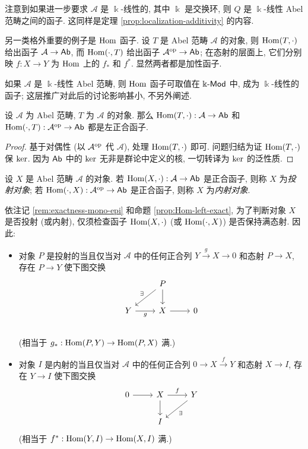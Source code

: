 注意到如果进一步要求 $\mathcal{A}$ 是 $\Bbbk$-线性的, 其中 $\Bbbk$ 是交换环, 则 $Q$ 是 $\Bbbk$-线性 Abel 范畴之间的函子. 这同样是定理 \ref{prop:localization-additivity} 的内容.

另一类格外重要的例子是 $\operatorname{Hom}$ 函子. 设 $T$ 是 Abel 范畴 $\mathcal{A}$ 的对象, 则 $\operatorname{Hom}(T, \cdot)$ 给出函子 $\mathcal{A} \to \mathsf{Ab}$, 而 $\operatorname{Hom}(\cdot, T)$ 给出函子 $\mathcal{A}^{\operatorname{op}} \to \mathsf{Ab}$; 在态射的层面上, 它们分别映 $f: X \to Y$ 为 $\operatorname{Hom}$ 上的 $f_*$ 和 $f^*$. 显然两者都是加性函子.

如果 $\mathcal{A}$ 是 $\Bbbk$-线性 Abel 范畴, 则 $\operatorname{Hom}$ 函子可取值在 $\Bbbk\text{-}\mathsf{Mod}$ 中, 成为 $\Bbbk$-线性的函子; 这层推广对此后的讨论影响甚小, 不另外阐述.

\begin{proposition}\label{prop:Hom-left-exact}
	设 $\mathcal{A}$ 为 Abel 范畴, $T$ 为 $\mathcal{A}$ 的对象. 那么 $\operatorname{Hom}(T, \cdot): \mathcal{A} \to \mathsf{Ab}$ 和 $\operatorname{Hom}(\cdot, T): \mathcal{A}^{\operatorname{op}} \to \mathsf{Ab}$ 都是左正合函子.
\end{proposition}
\begin{proof}
	基于对偶性 (以 $\mathcal{A}^{\operatorname{op}}$ 代 $\mathcal{A}$), 处理 $\operatorname{Hom}(T, \cdot)$ 即可. 问题归结为证 $\operatorname{Hom}(T, \cdot)$ 保 $\operatorname{ker}$. 因为 $\mathsf{Ab}$ 中的 $\operatorname{ker}$ 无非是群论中定义的核, 一切转译为 $\operatorname{ker}$ 的泛性质.
\end{proof}

\begin{definition}\label{def:injective-projective-obj}
	设 $X$ 是 Abel 范畴 $\mathcal{A}$ 的对象. 若 $\operatorname{Hom}(X, \cdot): \mathcal{A} \to \mathsf{Ab}$ 是正合函子, 则称 $X$ 为\emph{投射对象}; 若 $\operatorname{Hom}(\cdot, X): \mathcal{A}^{\operatorname{op}} \to \mathsf{Ab}$ 是正合函子, 则称 $X$ 为\emph{内射对象}.
\end{definition}

依注记 \ref{rem:exactness-mono-epi} 和命题 \ref{prop:Hom-left-exact}, 为了判断对象 $X$ 是否投射 (或内射), 仅须检查函子 $\operatorname{Hom}(X, \cdot)$ (或 $\operatorname{Hom}(\cdot, X)$) 是否保持满态射. 因此:
\begin{itemize}
	\item 对象 $P$ 是投射的当且仅当对 $\mathcal{A}$ 中的任何正合列 $Y \xrightarrow{g} X \to 0$ 和态射 $P \to X$, 存在 $P \to Y$ 使下图交换
	\[\begin{tikzcd}
		& P \arrow[d] \arrow[ld, "\exists"'] & \\
		Y \arrow[r, "g"'] & X \arrow[r] & 0 \\
	\end{tikzcd}\]
	(相当于 $g_*: \operatorname{Hom}(P, Y) \to \operatorname{Hom}(P, X)$ 满.)
	\item 对象 $I$ 是内射的当且仅当对 $\mathcal{A}$ 中的任何正合列 $0 \to X \xrightarrow{f} Y$ 和态射 $X \to I$, 存在 $Y \to I$ 使下图交换
	\[\begin{tikzcd}
		0 \arrow[r] & X \arrow[r, "f"] \arrow[d] & Y \arrow[ld, "\exists"] \\
		& I &
	\end{tikzcd}\]
	(相当于 $f^*: \operatorname{Hom}(Y, I) \to \operatorname{Hom}(X, I)$ 满.)
\end{itemize}

